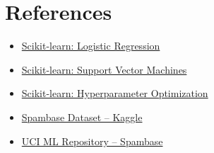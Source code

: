 \documentclass[11pt]{article}
\begin{document}
\section*{References}
\begin{itemize}
    \item \href{https://scikit-learn.org/stable/modules/linear_model.html#logistic-regression}{Scikit-learn: Logistic Regression}
    \item \href{https://scikit-learn.org/stable/modules/svm.html}{Scikit-learn: Support Vector Machines}
    \item \href{https://scikit-learn.org/stable/modules/grid_search.html}{Scikit-learn: Hyperparameter Optimization}
    \item \href{https://www.kaggle.com/datasets/somesh24/spambase}{Spambase Dataset – Kaggle}
    \item \href{https://archive.ics.uci.edu/ml/datasets/spambase}{UCI ML Repository – Spambase}
\end{itemize}
\end{document}
